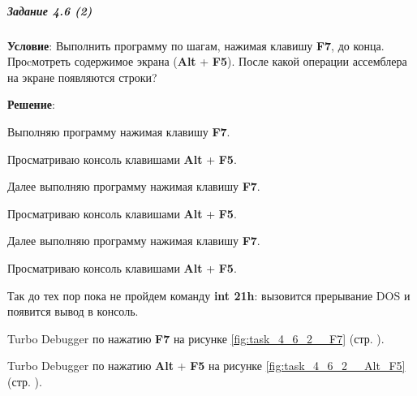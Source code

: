 \subparagraph{Задание 4.6 (2)}

\textbf{Условие}:
Выполнить программу по шагам, нажимая клавишу \textbf{F7}, до конца. Проcмотреть содержимое экрана (\textbf{Alt} + \textbf{F5}). После какой операции ассемблера на экране появляются строки?
 
\textbf{Решение}:

Выполняю программу нажимая клавишу \textbf{F7}.

Просматриваю консоль клавишами \textbf{Alt} + \textbf{F5}.

Далее выполняю программу нажимая клавишу \textbf{F7}.

Просматриваю консоль клавишами \textbf{Alt} + \textbf{F5}.

Далее выполняю программу нажимая клавишу \textbf{F7}.

Просматриваю консоль клавишами \textbf{Alt} + \textbf{F5}.

Так до тех пор пока не пройдем команду \textbf{int 21h}: вызовится прерывание DOS и появится вывод в консоль.

Turbo Debugger по нажатию \textbf{F7} на рисунке \ref{fig:task_4_6_2__F7} (стр. \pageref{fig:task_4_6_2__F7}).

Turbo Debugger по нажатию \textbf{Alt} + \textbf{F5} на рисунке \ref{fig:task_4_6_2__Alt_F5} (стр. \pageref{fig:task_4_6_2__Alt_F5}).

